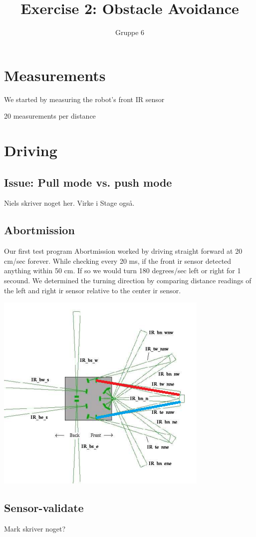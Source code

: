 \documentclass[a4paper,12pt]{article}
\title{Exercise 2: Obstacle Avoidance}
\author{Gruppe 6}
\begin{document}
\maketitle

\section{Measurements}

We started by measuring the robot's front IR sensor

20 measurements per distance


\section{Driving}

\subsection{Issue: Pull mode vs. push mode}

Niels skriver noget her.  Virke i Stage også.


\subsection{Abortmission}

Our first test program Abortmission worked by driving straight forward at 20 cm/sec forever. While checking every 20 ms, if the front ir sensor detected anything within 50 cm. If so we would turn 180 degrees/sec left or right for 1 secound. We determined the turning direction by comparing distance readings of the left and right ir sensor relative to the center ir sensor.

\includegraphics{robot2.png}

\subsection{Sensor-validate}

Mark skriver noget?
\end{document}
